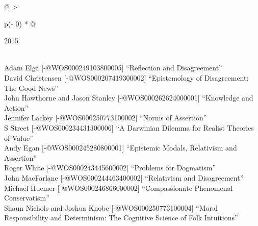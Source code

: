 \documentclass[
  10pt,
  letterpaper,
  DIV=11,
  numbers=noendperiod,
  twoside]{scrartcl}
\begin{document}
\begin{longtable}[]{@{}
  >{\raggedright\arraybackslash}p{(\columnwidth - 0\tabcolsep) * }@{}}

\caption{\label{tbl-top-ten-2006}Most cited articles published less than
ten years ago as of 2015.}

\tabularnewline

\toprule\noalign{}
\begin{minipage}[b]{\linewidth}\raggedright
2015
\end{minipage} \\
\midrule\noalign{}
\endhead
\bottomrule\noalign{}
\endlastfoot
Adam Elga {[}-@WOS000249103800005{]} ``Reflection and Disagreement'' \\
David Christensen {[}-@WOS000207419300002{]} ``Epistemology of
Disagreement: The Good News'' \\
John Hawthorne and Jason Stanley {[}-@WOS000262624000001{]} ``Knowledge
and Action'' \\
Jennifer Lackey {[}-@WOS000250773100002{]} ``Norms of Assertion'' \\
S Street {[}-@WOS000234431300006{]} ``A Darwinian Dilemma for Realist
Theories of Value'' \\
Andy Egan {[}-@WOS000245280800001{]} ``Epistemic Modals, Relativism and
Assertion'' \\
Roger White {[}-@WOS000243445600002{]} ``Problems for Dogmatism'' \\
John MacFarlane {[}-@WOS000244463400002{]} ``Relativism and
Disagreement'' \\
Michael Huemer {[}-@WOS000246866000002{]} ``Compassionate Phenomenal
Conservatism'' \\
Shaun Nichols and Joshua Knobe {[}-@WOS000250773100004{]} ``Moral
Responsibility and Determinism: The Cognitive Science of Folk
Intuitions'' \\

\end{longtable}
\end{document}
